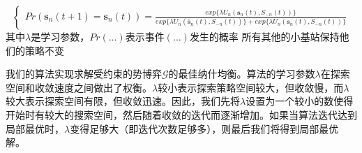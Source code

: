 \documentclass[bachelor]{seuthesis} %
\begin{document}
\begin{Main}
\begin{algorithm}
\begin{algorithmic}[1]
\begin{equation}
\begin{cases}
        Pr(\textbf{s}_n(t+1)=\textbf{s}_n(t))=\frac{exp\{\lambda U_n(\textbf{s}_n(t),S_{-n}(t))\}}{exp\{\lambda U_n(\hat{\textbf{s}}_n(t),S_{-n}(t))\}+exp\{\lambda U_n(\textbf{s}_n(t),S_{-n}(t))\}}
       \end{cases}
       \end{equation}
       \State 其中$\lambda$是学习参数，$Pr(\dots)$表示事件$(\dots)$发生的概率
       \State 所有其他的小基站保持他们的策略不变
       \EndFor
    \end{algorithmic}
\end{algorithm}
我们的算法实现求解受约束的势博弈$\mathcal{G}$的最佳纳什均衡。算法的学习参数$\lambda$在探索空间和收敛速度之间做出了权衡。$\lambda$较小表示探索策略空间较大，但收敛慢，而$\lambda$ 较大表示探索空间有限，但收敛迅速\cite{xu2012opportunistic}\cite{zheng2014optimal}。因此，我们先将$\lambda$设置为一个较小的数使得开始时有较大的搜索空间，然后随着收敛的迭代而逐渐增加。如果当算法迭代达到局部最优时，$\lambda$变得足够大（即迭代次数足够多），则最后我们将得到局部最优解。

\end{Main}
\end{document}
